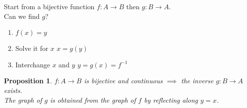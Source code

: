 \documentclass[letterpaper, 12pt]{article}
\newtheorem{proposition}[theorem]{Proposition}
\newenvironment{remark}[1][Remark]{\begin{trivlist}
\item[\hskip \labelsep {\bfseries #1}]}{\end{trivlist}}
\begin{document}
    \begin{remark}
        Start from a bijective function $f: A \rightarrow B$ then $g: B\rightarrow A$. \\
        Can we find $g$?
        \begin{enumerate}
            \item $f(x) = y$
            \item Solve it for $x$ \quad $x = g(y)$
            \item Interchange $x$ and $y$ \quad $y = g(x) = f^{-1}$
        \end{enumerate}
    \end{remark}
    \begin{proposition}
        $f: A \rightarrow B$ is bijective and continuous $\implies$ the inverse 
        $g: B \rightarrow A$ exists. \\
        The graph of $g$ is obtained from the graph of $f$ by reflecting along $y = x$.
    \end{proposition}
\end{document}
